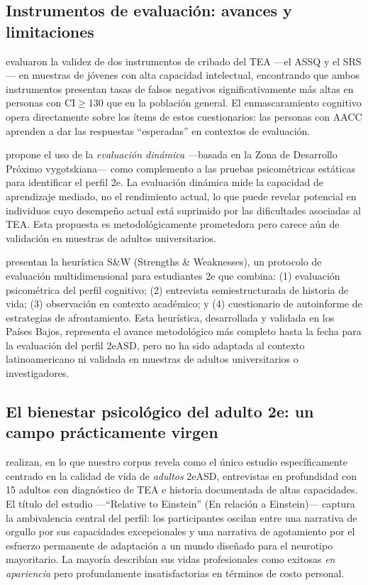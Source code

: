 \subsection{Instrumentos de evaluación: avances y limitaciones}

\textcite{cederberg2018} evaluaron la validez de dos instrumentos de cribado del
TEA —el ASSQ y el SRS— en muestras de jóvenes con alta capacidad intelectual,
encontrando que ambos instrumentos presentan tasas de falsos negativos
significativamente más altas en personas con CI$\geq$130 que en la población
general. El enmascaramiento cognitivo opera directamente sobre los ítems de estos
cuestionarios: las personas con AACC aprenden a dar las respuestas ``esperadas''
en contextos de evaluación.

\textcite{alhroub2021} propone el uso de la \textit{evaluación dinámica}
—basada en la Zona de Desarrollo Próximo vygotskiana— como complemento a las
pruebas psicométricas estáticas para identificar el perfil 2e. La evaluación
dinámica mide la capacidad de aprendizaje mediado, no el rendimiento actual,
lo que puede revelar potencial en individuos cuyo desempeño actual está
suprimido por las dificultades asociadas al TEA. Esta propuesta es
metodológicamente prometedora pero carece aún de validación en muestras de
adultos universitarios.

\textcite{burgerveltmeijer2023} presentan la heurística S\&W (Strengths \&
Weaknesses), un protocolo de evaluación multidimensional para estudiantes 2e
que combina: (1) evaluación psicométrica del perfil cognitivo; (2) entrevista
semiestructurada de historia de vida; (3) observación en contexto académico; y
(4) cuestionario de autoinforme de estrategias de afrontamiento. Esta heurística,
desarrollada y validada en los Países Bajos, representa el avance metodológico
más completo hasta la fecha para la evaluación del perfil 2eASD, pero no ha
sido adaptada al contexto latinoamericano ni validada en muestras de adultos
universitarios o investigadores.

\subsection{El bienestar psicológico del adulto 2e: un campo prácticamente virgen}

\textcite{wallpolin2017} realizan, en lo que nuestro corpus revela como el único
estudio específicamente centrado en la calidad de vida de \textit{adultos}
2eASD, entrevistas en profundidad con 15 adultos con diagnóstico de TEA e
historia documentada de altas capacidades. El título del estudio —``Relative
to Einstein'' (En relación a Einstein)— captura la ambivalencia central del
perfil: los participantes oscilan entre una narrativa de orgullo por sus
capacidades excepcionales y una narrativa de agotamiento por el esfuerzo
permanente de adaptación a un mundo diseñado para el neurotipo mayoritario.
La mayoría describían sus vidas profesionales como exitosas \textit{en
apariencia} pero profundamente insatisfactorias en términos de costo personal.

